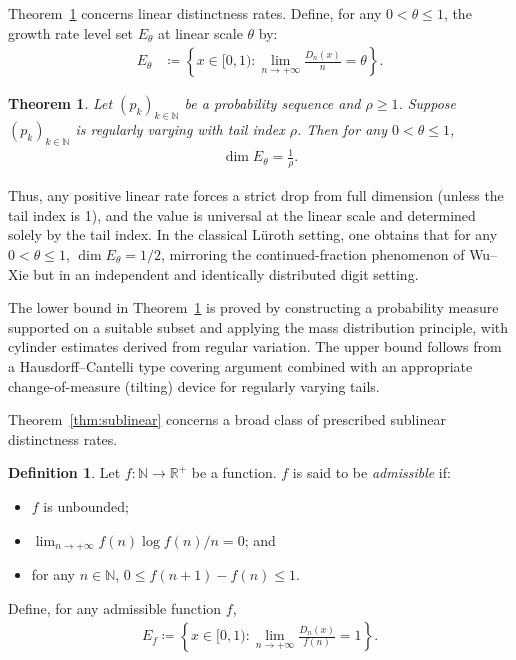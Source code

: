 \documentclass[12pt,reqno]{amsart}
\theoremstyle{definition}
\newtheorem*{defi}{Definition}
\theoremstyle{plain}
\newtheorem{thm}{Theorem}
\begin{document}
Theorem~\ref{thm:linear} concerns linear distinctness rates.
Define, for any $0<\theta\leq1$, the growth rate level set $E_\theta$ at linear scale $\theta$ by:
\begin{align*}
    E_\theta
    &\coloneqq \left\{x\in[0,1):\lim_{n\to+\infty}\frac{D_n(x)}{n}= \theta\right\}.
\end{align*}

\begin{thm}\label{thm:linear}
Let $(p_k)_{k\in\mathbb{N}}$ be a probability sequence and $\rho\geq 1$.
Suppose $(p_k)_{k\in\mathbb{N}}$ is regularly varying with tail index $\rho$.
Then for any $0<\theta\leq 1$,
\begin{align*}
    \dim{E_\theta}
    =\frac{1}{\rho}.
\end{align*}
\end{thm}
Thus, any positive linear rate forces a strict drop from full dimension (unless the tail index is 1), and the value is universal at the linear scale and determined solely by the tail index. In the classical L\"uroth setting, one obtains that for any $0<\theta\leq1$, $\dim{E_\theta}=1/2$, mirroring the continued-fraction phenomenon of Wu--Xie but in an independent and identically distributed digit setting.

The lower bound in Theorem~\ref{thm:linear} is proved by constructing a probability measure supported on a suitable subset and applying the mass distribution principle, with cylinder estimates derived from regular variation. The upper bound follows from a Hausdorff--Cantelli type covering argument combined with an appropriate change-of-measure (tilting) device for regularly varying tails.

Theorem~\ref{thm:sublinear} concerns a broad class of prescribed sublinear distinctness rates.
\begin{defi}\label{def:admissible}
Let $f:\mathbb{N}\to\mathbb{R}^+$ be a function. $f$ is said to be \emph{admissible} if:
\begin{itemize}
    \item $f$ is unbounded;
    \item $\lim_{n\to+\infty}f(n)\log{f(n)}/n=0$; and
    \item for any $n\in\mathbb{N}$, $0\leq f(n+1)-f(n)\leq1$.
\end{itemize}
\end{defi}

Define, for any admissible function $f$,
\begin{align*}
    E_f\coloneqq \left\{x\in[0,1): \lim_{n\to+\infty}\frac{D_n(x)}{f(n)}=1\right\}.
\end{align*}
\end{document}
